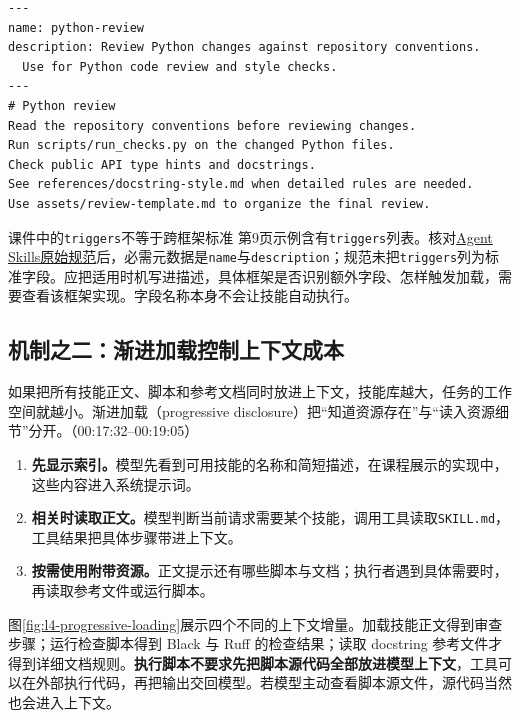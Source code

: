 \documentclass[11pt,a4paper]{article}
\begin{document}
\par\noindent\begin{minipage}{\linewidth}
\begin{lstlisting}[language={},caption={教学例子：元数据帮助选择，正文指导执行}]
---
name: python-review
description: Review Python changes against repository conventions.
  Use for Python code review and style checks.
---
# Python review
Read the repository conventions before reviewing changes.
Run scripts/run_checks.py on the changed Python files.
Check public API type hints and docstrings.
See references/docstring-style.md when detailed rules are needed.
Use assets/review-template.md to organize the final review.
\end{lstlisting}
\end{minipage}

\begin{warningbox}{课件中的\texttt{triggers}不等于跨框架标准}
第9页示例含有\texttt{triggers}列表。核对\href{https://agentskills.io/specification}{Agent Skills原始规范}后，必需元数据是\texttt{name}与\texttt{description}；规范未把\texttt{triggers}列为标准字段。应把适用时机写进描述，具体框架是否识别额外字段、怎样触发加载，需要查看该框架实现。字段名称本身不会让技能自动执行。
\end{warningbox}

\subsection{机制之二：渐进加载控制上下文成本}

如果把所有技能正文、脚本和参考文档同时放进上下文，技能库越大，任务的工作空间就越小。渐进加载（progressive disclosure）把“知道资源存在”与“读入资源细节”分开。（00:17:32--00:19:05）

\begin{enumerate}
\item \textbf{先显示索引。}模型先看到可用技能的名称和简短描述，在课程展示的实现中，这些内容进入系统提示词。
\item \textbf{相关时读取正文。}模型判断当前请求需要某个技能，调用工具读取\texttt{SKILL.md}，工具结果把具体步骤带进上下文。
\item \textbf{按需使用附带资源。}正文提示还有哪些脚本与文档；执行者遇到具体需要时，再读取参考文件或运行脚本。
\end{enumerate}

图\ref{fig:l4-progressive-loading}展示四个不同的上下文增量。加载技能正文得到审查步骤；运行检查脚本得到 Black 与 Ruff 的检查结果；读取 docstring 参考文件才得到详细文档规则。\textbf{执行脚本不要求先把脚本源代码全部放进模型上下文}，工具可以在外部执行代码，再把输出交回模型。若模型主动查看脚本源文件，源代码当然也会进入上下文。
\end{document}

